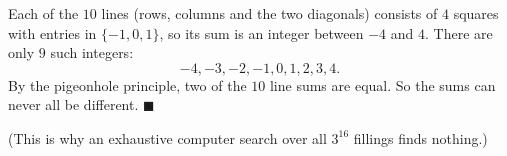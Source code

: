 Each of the $10$ lines (rows, columns and the two diagonals) consists of $4$ squares with entries in $\{-1,0,1\}$, so its sum is an integer between $-4$ and $4$. There are only $9$ such integers:
\[
-4,-3,-2,-1,0,1,2,3,4 .
\]
By the pigeonhole principle, two of the $10$ line sums are equal. So the sums can never all be different. $\blacksquare$

(This is why an exhaustive computer search over all $3^{16}$ fillings finds nothing.)
